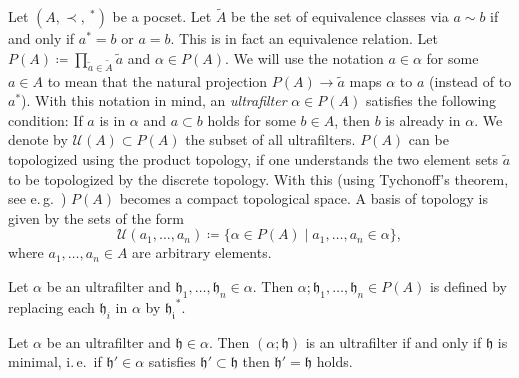 \begin{defin}[Ultrafilter]
  Let \((A, \prec, \ ^\ast)\) be a pocset. Let \(\tilde A\) be the set of equivalence classes via \(a \sim b\) if and only if \(a^\ast = b\) or \(a = b\). This is in fact an equivalence relation. Let \(P(A) \coloneqq \prod_{\tilde a \in \tilde A} \tilde a\) and \(\alpha \in P(A)\). We will use the notation \(a \in \alpha\) for some \(a \in A\) to mean that the natural projection \(P(A) \to \tilde a\) maps \(\alpha\) to \(a\) (instead of to \(a^\ast\)). With this notation in mind, an \emph{ultrafilter} \(\alpha \in P(A)\) satisfies the following condition: If \(a\) is in \(\alpha\) and \(a \subset b\) holds for some \(b \in A\), then \(b\) is already in \(\alpha\). We denote by \(\mathcal{U}(A) \subset P(A)\) the subset of all ultrafilters. \(P(A)\) can be topologized using the product topology, if one understands the two element sets \(\tilde a\) to be topologized by the discrete topology. With this (using Tychonoff's theorem, see e.\,g.~\cite[Chapter~10]{MR1275831}) \(P(A)\) becomes a compact topological space. A basis of topology is given by the sets of the form
\[
  \mathcal{U}(a_1,\dots, a_n) \coloneqq \{\alpha \in P(A) \mid a_1, \dots, a_n \in \alpha\},
\]
where \(a_1,\dots, a_n \in A\) are arbitrary elements.
\end{defin}

\begin{bsp}
\end{bsp}

\begin{defin}
  Let \(\alpha\) be an ultrafilter and \(\mathfrak{h}_1, \dots, \mathfrak{h}_n \in \alpha\). Then \(\alpha; \mathfrak{h}_1, \dots, \mathfrak{h}_n \in P(A)\) is defined by replacing each \(\mathfrak{h}_i\) in \(\alpha\) by \(\mathfrak{h_i}^\ast\).
\end{defin}

\begin{lemma}
  Let \(\alpha\) be an ultrafilter and \(\mathfrak{h} \in \alpha\). Then \((\alpha;\mathfrak{h})\) is an ultrafilter if and only if \(\mathfrak{h}\) is minimal, i.\,e.\ if \(\mathfrak{h}' \in \alpha\) satisfies \(\mathfrak{h'} \subset \mathfrak{h}\) then \(\mathfrak{h'} = \mathfrak{h}\) holds.
\end{lemma}

